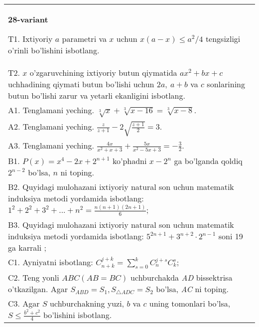 \documentclass{article}
\begin{document}
\begin{tabular}{m{17cm}}
\textbf{28-variant}
\newline

T1. Ixtiyoriy \(a\) parametri va \(x\) uchun \(x(a - x) \leq a^{2}/4\) tengsizligi o'rinli bo'lishini isbotlang. \\
T2. \(x\) o'zgaruvchining ixtiyoriy butun qiymatida \(ax^{2} + bx + c\) uchhadining qiymati butun bo'lishi uchun \(2a,\ a + b\) va \(c\) sonlarining butun bo'lishi zarur va yetarli ekanligini isbotlang. \\
A1. Tenglamani yeching. \(\sqrt[3]{x} + \sqrt[3]{x - 16} = \sqrt[3]{x - 8}\). \\
A2. Tenglamani yeching. \(\frac{z}{z + 1} - 2\sqrt{\frac{z + 1}{2}} = 3\). \\
A3. Tenglamani yeching. \(\frac{4x}{x^{2} + x + 3} + \frac{5x}{x^{2} - 5x + 3} = - \frac{3}{2}\). \\
B1. \(P(x) = x^{4} - 2x + 2^{n + 1}\) ko'phadni \(x - 2^{n}\) ga bo'lganda qoldiq \(2^{n - 2}\) bo'lsa, \(n\) ni toping. \\
B2. Quyidagi mulohazani ixtiyoriy natural son uchun matematik induksiya metodi yordamida isbotlang: \(1^{2} + 2^{2} + 3^{2} + ... + n^{2} = \frac{n(n + 1)(2n + 1)}{6}\); \\
B3. Quyidagi mulohazani ixtiyoriy natural son uchun matematik induksiya metodi yordamida isbotlang: \(5^{2n + 1} + 3^{n + 2} \cdot 2^{n - 1}\) soni 19 ga karrali ; \\
C1. Ayniyatni isbotlang: \(C_{n + k}^{j + k} = \sum_{s = 0}^{k}C_{n}^{j + s}C_{k}^{s}\); \\
C2. Teng yonli \(ABC(AB = BC)\) uchburchakda \emph{AD} bissektrisa o'tkazilgan. Agar \(S_{ABD} = S_{1},S_{\bigtriangleup ADC} = S_{2}\) bo'lsa, \emph{AC} ni toping. \\
C3. Agar \(S\) uchburchakning yuzi, \(b\) va \(c\) uning tomonlari bo'lsa, \(S \leq \frac{b^{2} + c^{2}}{4}\) bo'lishini isbotlang. \\

\end{tabular}
\vspace{1cm}
\end{document}
